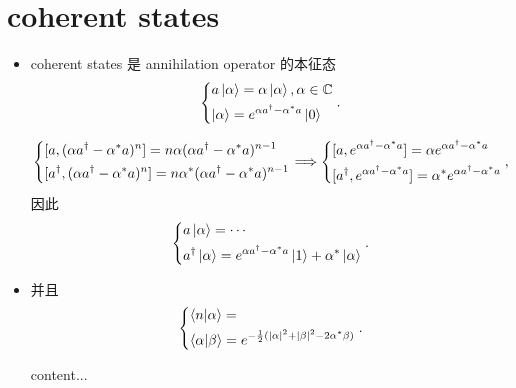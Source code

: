 \documentclass[10pt, a4paper]{article}
\numberwithin{equation}{section}
\begin{document}
	\section{coherent states}
	\begin{itemize}
		\item coherent states 是 annihilation operator 的本征态
		\begin{equation}
			\begin{dcases}
				a \ket{\alpha} = \alpha \ket{\alpha}, \alpha \in \mathbb{C} \\
				\ket{\alpha} = e^{\alpha a^\dag - \alpha^* a} \ket{0}
			\end{dcases}.
		\end{equation}
		
		\begin{tcolorbox}[title=proof:]
			\begin{equation}
				\begin{dcases}
					[a, (\alpha a^\dag - \alpha^* a)^n] = n \alpha (\alpha a^\dag - \alpha^* a)^{n - 1} \\
					[a^\dag, (\alpha a^\dag - \alpha^* a)^n] = n \alpha^* (\alpha a^\dag - \alpha^* a)^{n - 1}
				\end{dcases} \Longrightarrow \begin{dcases}
					[a, e^{\alpha a^\dag - \alpha^* a}] = \alpha e^{\alpha a^\dag - \alpha^* a} \\
					[a^\dag, e^{\alpha a^\dag - \alpha^* a}] = \alpha^* e^{\alpha a^\dag - \alpha^* a}
				\end{dcases},
			\end{equation}
			因此
			\begin{equation}
				\begin{dcases}
					a \ket{\alpha} = \cdots \\
					a^\dag \ket{\alpha} = e^{\alpha a^\dag - \alpha^* a} \ket{1} + \alpha^* \ket{\alpha}
				\end{dcases}.
			\end{equation}
		\end{tcolorbox}
		
		\item 并且
		\begin{equation}
			\begin{dcases}
				\braket{n | \alpha} = \\
				\braket{\alpha | \beta} = e^{- \frac{1}{2} (|\alpha|^2 + |\beta|^2 - 2 \alpha^* \beta)}
			\end{dcases}.
		\end{equation}
		
		\begin{tcolorbox}[title=calculation:]
			content...
		\end{tcolorbox}
	\end{itemize}
\end{document}
